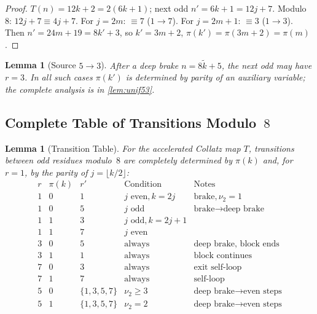 \documentclass[12pt,a4paper]{article}
\newtheorem{lemma}[theorem]{Lemma}
\theoremstyle{definition}
\theoremstyle{remark}
\begin{document}
\begin{proof}
$T(n)=12k+2=2(6k+1)$; next odd $n'=6k+1=12j+7$.
Modulo~$8$: $12j+7\equiv4j+7$.
For $j=2m$: $\equiv7$ ($1\to7$).
For $j=2m+1$: $\equiv3$ ($1\to3$).
Then $n'=24m+19=8k'+3$, so $k'=3m+2$, $\pi(k')=\pi(3m+2)=\pi(m)$.
\end{proof}

\begin{lemma}[Source $5\to3$]\label{lem:source53}
After a deep brake $n=8\tilde k+5$, the next odd may have $r=3$.
In all such cases $\pi(k')$ is determined by parity of an auxiliary
variable; the complete analysis is in \cref{lem:unif53}.
\end{lemma}

\subsection{Complete Table of Transitions Modulo~$8$}

\begin{lemma}[Transition Table]\label{lem:table}
For the accelerated Collatz map $T$, transitions between odd residues
modulo~$8$ are completely determined by $\pi(k)$ and, for $r=1$, by the
parity of $j=\lfloor k/2\rfloor$:
\[
\begin{array}{c|c|c|c|l}
r & \pi(k) & r' & \text{Condition} & \text{Notes}\\\hline
1 & 0 & 1 & j\text{ even}, k=2j   & \text{brake}, \nu_2=1\\
1 & 0 & 5 & j\text{ odd}          & \text{brake}\to\text{deep brake}\\
1 & 1 & 3 & j\text{ odd}, k=2j+1  &\\
1 & 1 & 7 & j\text{ even}         &\\\hline
3 & 0 & 5 & \text{always} & \text{deep brake, block ends}\\
3 & 1 & 1 & \text{always} & \text{block continues}\\\hline
7 & 0 & 3 & \text{always} & \text{exit self‑loop}\\
7 & 1 & 7 & \text{always} & \text{self‑loop}\\\hline
5 & 0 &\{1,3,5,7\}& \nu_2\ge3 & \text{deep brake}\to\text{even steps}\\
5 & 1 &\{1,3,5,7\}& \nu_2=2  & \text{deep brake}\to\text{even steps}
\end{array}
\]
\end{lemma}
\end{document}
